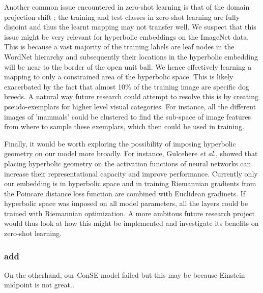 \documentclass[12pt]{report}
\begin{document}
Another common issue encountered in zero-shot learning is that of the domain projection shift \cite{Fu2015}; the training and test classes in zero-shot learning are fully disjoint and thus the learnt mapping may not transfer well. We suspect that this issue might be very relevant for hyperbolic embeddings on the ImageNet data. This is because a vast majority of the training labels are leaf nodes in the WordNet hierarchy and subsequently their locations in the hyperbolic embedding will be near to the border of the open unit ball. We hence effectively learning a mapping to only a constrained area of the hyperbolic space. This is likely exacerbated by the fact that almost 10\% \cite{Peterson2018} of the training image are specific dog breeds. A natural way future research could attempt to resolve this is by creating pseudo-exemplars for higher level visual categories. For instance, all the different images of 'mammals' could be clustered to find the sub-space of image features from where to sample these exemplars, which then could be used in training.

Finally, it would be worth exploring the possibility of imposing hyperbolic geometry on our model more broadly. For instance, Gulcehere \textit{et al.}, showed that placing hyperbolic geometry on the activation functions of neural networks can increase their representational capacity and improve performance. Currently only our embedding is in hyperbolic space and in training Riemannian gradients from the Poincare distance loss function are combined with Euclidean gradinets. If hyperbolic space was imposed on all model parameters, all the layers could be trained with Riemannian optimization. A more ambitous future research project would thus look at how this might be implemented and investigate its benefits on zero-shot learning.



\subsubsection{add}

On the otherhand, our ConSE model failed but this may be because Einstein midpoint is not great..



\end{document}
